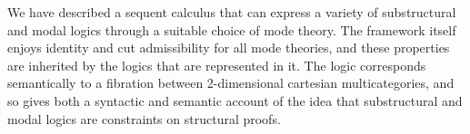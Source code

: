 
We have described a sequent calculus that can express a variety of
substructural and modal logics through a suitable choice of mode theory.
The framework itself enjoys identity and cut admissibility for all mode
theories, and these properties are inherited by the logics that are
represented in it.  The logic corresponds semantically to a fibration
between 2-dimensional cartesian multicategories, and so gives both a
syntactic and semantic account of the idea that substructural and modal
logics are constraints on structural proofs.  


